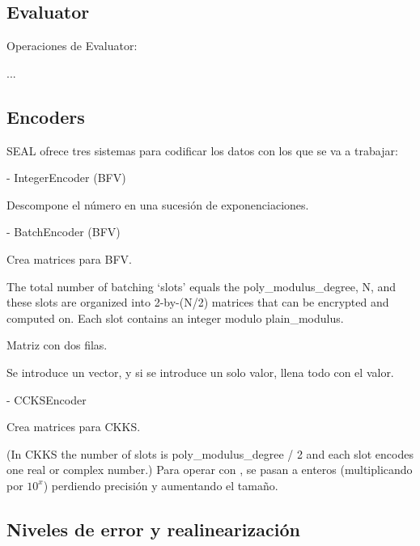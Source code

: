 
\subsection{Evaluator}

Operaciones de Evaluator:

...

\subsection{Encoders}

SEAL ofrece tres sistemas para codificar los datos con los que se va a trabajar:

    - IntegerEncoder (BFV)

    Descompone el número en una sucesión de exponenciaciones.

    - BatchEncoder (BFV)

    Crea matrices para BFV.

    The total number of batching `slots' equals the poly_modulus_degree, N, and
    these slots are organized into 2-by-(N/2) matrices that can be encrypted and
    computed on. Each slot contains an integer modulo plain_modulus.

    Matriz con dos filas.

    Se introduce un vector, y si se introduce un solo valor, llena todo con el valor.

    - CCKSEncoder

    Crea matrices para CKKS.


     (In CKKS the number of slots is poly\_modulus\_degree / 2 and each slot encodes one real or complex number.) Para operar con , se pasan a enteros (multiplicando por $10^x$) perdiendo precisión y aumentando el tamaño.

\subsection{Niveles de error y realinearización}

